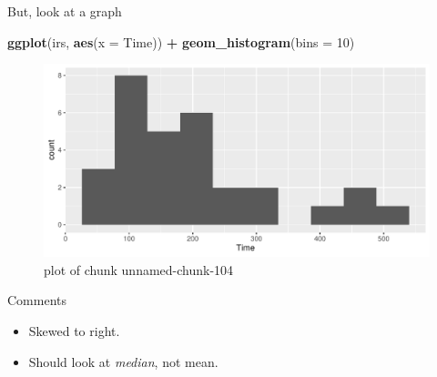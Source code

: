 \documentclass[ignorenonframetext,]{beamer}
\newenvironment{Shaded}{\begin{snugshade}}{\end{snugshade}}
\newcommand{\DataTypeTok}[1]{\textcolor[rgb]{0.13,0.29,0.53}{#1}}
\newcommand{\DecValTok}[1]{\textcolor[rgb]{0.00,0.00,0.81}{#1}}
\newcommand{\KeywordTok}[1]{\textcolor[rgb]{0.13,0.29,0.53}{\textbf{#1}}}
\newcommand{\NormalTok}[1]{#1}
\newcommand{\OperatorTok}[1]{\textcolor[rgb]{0.81,0.36,0.00}{\textbf{#1}}}
\newcommand{\StringTok}[1]{\textcolor[rgb]{0.31,0.60,0.02}{#1}}
\providecommand{\tightlist}{%
  \setlength{\itemsep}{0pt}\setlength{\parskip}{0pt}}
\begin{document}
\begin{frame}[fragile]{But, look at a graph}
\protect\hypertarget{but-look-at-a-graph}{}

\begin{Shaded}
\begin{Highlighting}[]
\KeywordTok{ggplot}\NormalTok{(irs, }\KeywordTok{aes}\NormalTok{(}\DataTypeTok{x =}\NormalTok{ Time)) }\OperatorTok{+}\StringTok{ }\KeywordTok{geom_histogram}\NormalTok{(}\DataTypeTok{bins =} \DecValTok{10}\NormalTok{)}
\end{Highlighting}
\end{Shaded}

\begin{figure}
\centering
\includegraphics{figure/unnamed-chunk-104-1.pdf}
\caption{plot of chunk unnamed-chunk-104}
\end{figure}

\end{frame}

\begin{frame}{Comments}
\protect\hypertarget{comments-5}{}

\begin{itemize}
\tightlist
\item
  Skewed to right.
\item
  Should look at \emph{median}, not mean.
\end{itemize}

\end{frame}
\end{document}
